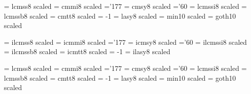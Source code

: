 
% 
\def\newfont#1#2{\@ifdefinable #1{\font #1=#2\relax}}
\def\symbol#1{\char #1\relax}


\font\fourteenrm   = lcmss8  scaled  %
\font\fourteeni    = cmmi8   scaled  %
    \skewchar\fourteeni ='177                  %
\font\fourteensy   = cmsy8   scaled  %
    \skewchar\fourteensy ='60           %
\font\fourteenit   = lcmssi8 scaled  %
\font\fourteenbf   = lcmssb8 scaled  %
\font\fourteentt   = cmtt8   scaled  %
    \hyphenchar\fourteentt = -1         %
\font\fourteenlasy = lasy8  scaled  %
\font\frtnmin = min10 scaled  %
\font\frtngt = goth10 scaled  %

\font\ifourteenrm   = ilcmss8  scaled  %
\font\ifourteeni    = icmmi8   scaled  %
    \skewchar\ifourteeni ='177                  %
\font\ifourteensy   = icmsy8   scaled  %
    \skewchar\ifourteensy ='60           %
\font\ifourteenit   = ilcmssi8 scaled  %
\font\ifourteenbf   = ilcmssb8 scaled  %
\font\ifourteentt   = icmtt8   scaled  %
    \hyphenchar\ifourteentt = -1         %
\font\ifourteenlasy = ilasy8  scaled  %

\font\seventeenrm   = lcmss8  scaled  %
\font\seventeeni    = cmmi8   scaled  %
    \skewchar\seventeeni ='177                  %
\font\seventeensy   = cmsy8   scaled  %
    \skewchar\seventeensy ='60           %
\font\seventeenit   = lcmssi8 scaled  %
\font\seventeenbf   = lcmssb8 scaled  %
\font\seventeentt   = cmtt8   scaled  %
    \hyphenchar\seventeentt = -1         %
\font\seventeenlasy = lasy8  scaled  %
\font\svtnmin = min10 scaled  %
\font\svtngt = goth10 scaled  %

